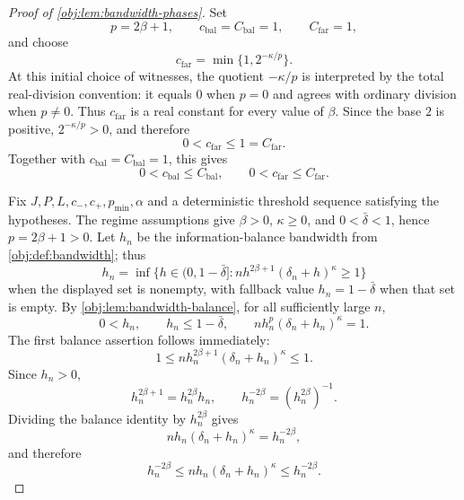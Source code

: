 \documentclass[11pt]{article}
\begin{document}
\begin{proof}[Proof of \cref{obj:lem:bandwidth-phases}]
Set
\[
p=2\beta+1,
\qquad
c_{\mathrm{bal}}=C_{\mathrm{bal}}=1,
\qquad
C_{\mathrm{far}}=1,
\]
and choose
\[
c_{\mathrm{far}}=\min\{1,2^{-\kappa/p}\}.
\]
At this initial choice of witnesses, the quotient \(-\kappa/p\) is interpreted by the total real-division convention: it equals \(0\) when \(p=0\) and agrees with ordinary division when \(p\ne0\). Thus \(c_{\mathrm{far}}\) is a real constant for every value of \(\beta\). Since the base \(2\) is positive, \(2^{-\kappa/p}>0\), and therefore
\[
0<c_{\mathrm{far}}\le1=C_{\mathrm{far}}.
\]
Together with \(c_{\mathrm{bal}}=C_{\mathrm{bal}}=1\), this gives
\[
0<c_{\mathrm{bal}}\le C_{\mathrm{bal}},
\qquad
0<c_{\mathrm{far}}\le C_{\mathrm{far}}.
\]

Fix \(J,P,L,c_-,c_+,p_{\min},\alpha\) and a deterministic threshold sequence satisfying the hypotheses. The regime assumptions give \(\beta>0\), \(\kappa\ge0\), and \(0<\bar\delta<1\), hence \(p=2\beta+1>0\). Let \(h_n\) be the information-balance bandwidth from \cref{obj:def:bandwidth}; thus
\[
h_n=\inf\{h\in(0,1-\bar\delta]:
n h^{2\beta+1}(\delta_n+h)^\kappa\ge1\}
\]
when the displayed set is nonempty, with fallback value \(h_n=1-\bar\delta\) when that set is empty. By \cref{obj:lem:bandwidth-balance}, for all sufficiently large \(n\),
\[
0<h_n,
\qquad
h_n\le1-\bar\delta,
\qquad
n h_n^{p}(\delta_n+h_n)^\kappa=1 .
\]
The first balance assertion follows immediately:
\[
1
\le
n h_n^{2\beta+1}(\delta_n+h_n)^\kappa
\le
1 .
\]
Since \(h_n>0\),
\[
h_n^{2\beta+1}=h_n^{2\beta}h_n,
\qquad
h_n^{-2\beta}=(h_n^{2\beta})^{-1}.
\]
Dividing the balance identity by \(h_n^{2\beta}\) gives
\[
n h_n(\delta_n+h_n)^\kappa=h_n^{-2\beta},
\]
and therefore
\[
h_n^{-2\beta}
\le
n h_n(\delta_n+h_n)^\kappa
\le
h_n^{-2\beta}.
\]


\end{proof}
\end{document}
